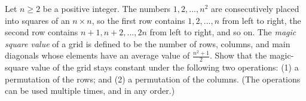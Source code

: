 Let $n\ge2$ be a positive integer. The numbers $1,2,..., n^2$ are consecutively placed into squares of an $n\times n$, so the first row contains $1,2,...,n$ from left to right, the second row contains $n+1,n+2,...,2n$ from left to right, and so on. The \textit{magic square value} of a grid is defined to be the number of rows, columns, and main diagonals whose elements have an average value of $\frac{n^2 + 1}{2}$. Show that the magic-square value of the grid stays constant under the following two operations: (1) a permutation of the rows; and (2) a permutation of the columns. (The operations can be used multiple times, and in any order.)

